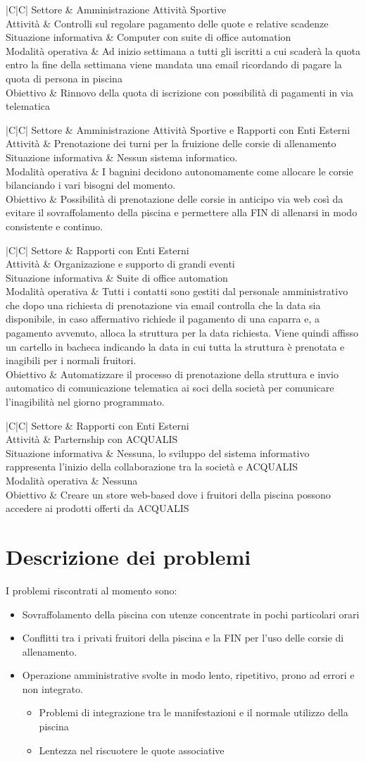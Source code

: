 \documentclass[11pt]{article} %
\newcommand{\AnalisiSituazioneAttualeTabella}[5]{
	\begin{tabulary}{\textwidth}{|C|C|}
		\hline
		Settore & #1 \\ \hline
		Attività & #2 \\ \hline
		Situazione informativa & #3 \\ \hline
		Modalità operativa & #4 \\ \hline
		Obiettivo & #5 \\
		\hline
	\end{tabulary}
}
\begin{document}
\AnalisiSituazioneAttualeTabella
	{Amministrazione Attività Sportive}
	{Controlli sul regolare pagamento delle quote e relative scadenze}
	{Computer con suite di office automation}
	{Ad inizio settimana a tutti gli iscritti a cui scaderà la quota entro la fine della settimana viene mandata una email ricordando di pagare la quota di persona in piscina}
	{Rinnovo della quota di iscrizione con possibilità di pagamenti in via telematica}

\AnalisiSituazioneAttualeTabella
	{Amministrazione Attività Sportive e Rapporti con Enti Esterni}
	{Prenotazione dei turni per la fruizione delle corsie di allenamento}
	{Nessun sistema informatico.}
	{I bagnini decidono autonomamente come allocare le corsie bilanciando i vari bisogni del momento.}
	{Possibilità di prenotazione delle corsie in anticipo via web così da evitare il sovraffolamento della piscina e permettere alla FIN di allenarsi in modo consistente e continuo.}

\AnalisiSituazioneAttualeTabella
	{Rapporti con Enti Esterni}
	{Organizazione e supporto di grandi eventi}
	{Suite di office automation}
	{Tutti i contatti sono gestiti dal personale amministrativo che dopo una richiesta di prenotazione via email controlla che la data sia disponibile, in caso affermativo richiede il pagamento di una caparra e, a pagamento avvenuto, alloca la struttura per la data richiesta. Viene quindi affisso un cartello in bacheca indicando la data in cui tutta la struttura è prenotata e inagibili per i normali fruitori.}
	{Automatizzare il processo di prenotazione della struttura e invio automatico di comunicazione telematica ai soci della società per comunicare l'inagibilità nel giorno programmato.}

\AnalisiSituazioneAttualeTabella
	{Rapporti con Enti Esterni}
	{Parternship con ACQUALIS}
	{Nessuna, lo sviluppo del sistema informativo rappresenta l'inizio della collaborazione tra la società e ACQUALIS}
	{Nessuna}
	{Creare un store web-based dove i fruitori della piscina possono accedere ai prodotti offerti da ACQUALIS}

\section{Descrizione dei problemi}

I problemi riscontrati al momento sono:

\begin{itemize}
	\item Sovraffolamento della piscina con utenze concentrate in pochi particolari orari
	\item Conflitti tra i privati fruitori della piscina e la FIN per l'uso delle corsie di allenamento.
	\item Operazione amministrative svolte in modo lento, ripetitivo, prono ad errori e non integrato.
	\begin{itemize}
		\item Problemi di integrazione tra le manifestazioni e il normale utilizzo della piscina
		\item Lentezza nel riscuotere le quote associative
	\end{itemize}
\end{itemize}
\end{document}
